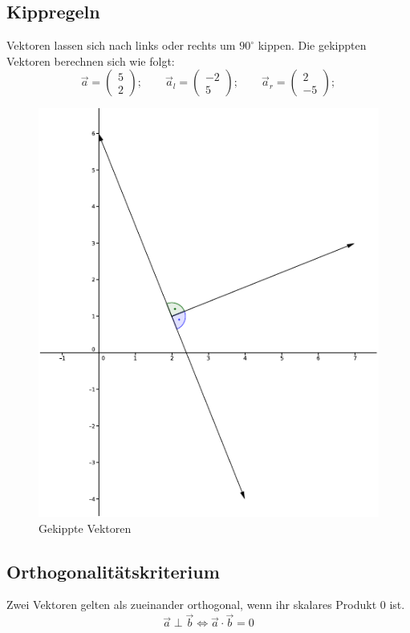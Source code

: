 \documentclass[12pt,a4paper]{scrbook}
\begin{document}
\subsection{Kippregeln}
Vektoren lassen sich nach links oder rechts um $90^{\circ}$ kippen.
Die gekippten Vektoren berechnen sich wie folgt:
\[ \vec{a} = \left(\begin{array}{c} 5\\ 2 \end{array}\right); \quad\quad \vec{a}_l = \left(\begin{array}{c} -2\\ 5 \end{array}\right); \quad\quad \vec{a}_r = \left(\begin{array}{c} 2\\ -5 \end{array}\right); \]
\begin{figure}
\centering
\includegraphics[scale=1]{img/vektor_kippen.pdf}
\caption{Gekippte Vektoren}
\end{figure}

\subsection{Orthogonalitätskriterium}
Zwei Vektoren gelten als zueinander orthogonal, wenn ihr skalares Produkt 0 ist.
\[ \vec{a} \perp \vec{b} \Longleftrightarrow \vec{a} \cdot \vec{b} = 0 \]
\end{document}
